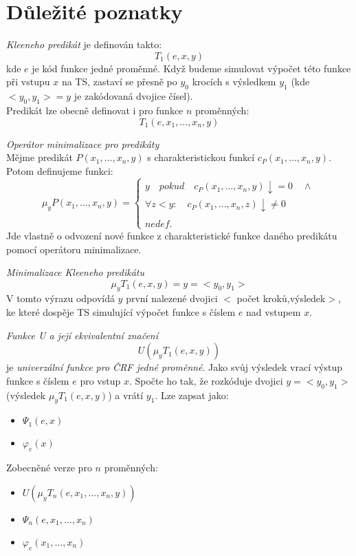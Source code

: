 \documentclass[a4paper]{article}      %
\newenvironment{definition}[1][Definice]{\begin{trivlist}
\item[\hskip \labelsep {\bfseries #1}]}{\end{trivlist}}
\newenvironment{remark}[1][Pozorování]{\begin{trivlist}
\item[\hskip \labelsep {\bfseries #1}]}{\end{trivlist}}
\begin{document}
\section*{Důležité poznatky}

\begin{definition} \emph{Kleeneho predikát} je definován takto:
\[T_1(e,x,y)\]
kde $e$ je kód funkce jedné proměnné. Když budeme simulovat výpočet této funkce při vstupu $x$ na TS, zastaví se přesně po $y_0$ krocích s výsledkem $y_1$
(kde $<y_0,y_1> = y$ je zakódovaná dvojice čísel).\\
Predikát lze obecně definovat i pro funkce $n$ proměnných:
\[T_1(e,x_1,\ldots,x_n,y)\]     
\end{definition}

\begin{definition} \emph{Operátor minimalizace pro predikáty}\\
Mějme predikát $P(x_1,\ldots,x_n,y)$ s charakteristickou funkcí $c_P(x_1,\ldots,x_n,y)$.
Potom definujeme funkci:
\[\mu_y P(x_1,\ldots,x_n,y) =
\left\{
\begin{array}{l}
y\quad pokud\quad c_P(x_1,\ldots,x_n,y)\downarrow = 0\quad \wedge\\
\forall z < y: \quad c_P(x_1,\ldots,x_n,z)\downarrow \neq 0\\
\\
nedef.
\end{array}
\right.
\]
Jde vlastně o odvození nové funkce z charakteristické funkce daného predikátu pomocí operátoru
minimalizace.
\end{definition}

\begin{remark} \emph{Minimalizace Kleeneho predikátu}\\
\[\mu_y T_1(e,x,y) = y = <y_0,y_1>\]
V tomto výrazu odpovídá $y$ první nalezené dvojici $<$ počet kroků,výsledek$>$, ke které dospěje TS simulující výpočet funkce s číslem $e$ nad vstupem $x$.       
\end{remark}

\begin{definition} \emph{Funkce U a její ekvivalentní značení}\\
\[U(\mu_y T_1(e,x,y))\]
je \emph{univerzální funkce pro ČRF jedné proměnné}. Jako svůj výsledek vrací výstup
funkce s číslem $e$ pro vstup $x$. Spočte ho tak, že rozkóduje dvojici $y = <y_0,y_1>$
(výsledek $\mu_y T_1(e,x,y)$)
a vrátí $y_1$. Lze zapsat jako:
\begin{itemize}
\item $\Psi_1(e,x)$
\item $\varphi_e(x)$
\end{itemize}
Zobecněné verze pro $n$ proměnných:
\begin{itemize}
\item $U(\mu_y T_n(e,x_1,\ldots,x_n,y))$
\item $\Psi_n(e,x_1,\ldots,x_n)$
\item $\varphi_e(x_1,\ldots,x_n)$
\end{itemize}
\end{definition}
\end{document}
